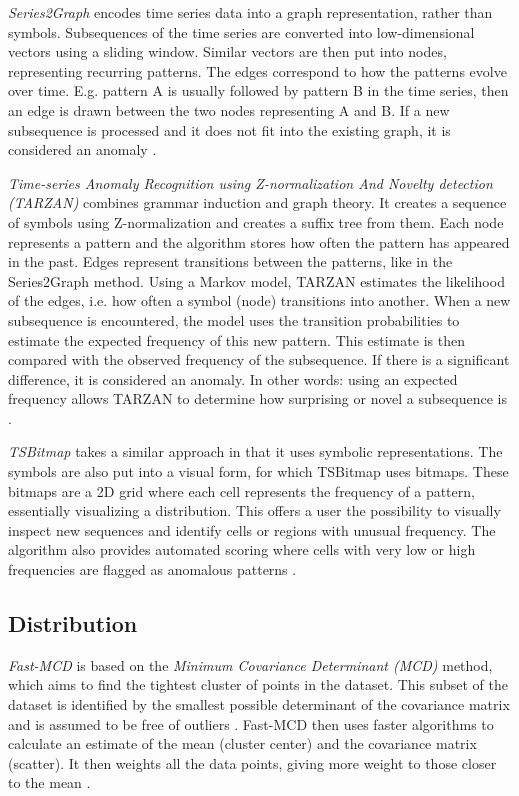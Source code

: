 \textit{Series2Graph} encodes time series data into a graph representation, rather than symbols. Subsequences of the time series are converted into low-dimensional vectors using a sliding window. Similar vectors are then put into nodes, representing recurring patterns. The edges correspond to how the patterns evolve over time. E.g. pattern A is usually followed by pattern B in the time series, then an edge is drawn between the two nodes representing A and B. If a new subsequence is processed and it does not fit into the existing graph, it is considered an anomaly \cite{Series2Graph}.

\textit{Time-series Anomaly Recognition using Z-normalization And Novelty detection (TARZAN)} combines grammar induction and graph theory. It creates a sequence of symbols using Z-normalization and creates a suffix tree from them. Each node represents a pattern and the algorithm stores how often the pattern has appeared in the past. Edges represent transitions between the patterns, like in the Series2Graph method. Using a Markov model, TARZAN estimates the likelihood of the edges, i.e. how often a symbol (node) transitions into another. When a new subsequence is encountered, the model uses the transition probabilities to estimate the expected frequency of this new pattern. This estimate is then compared with the observed frequency of the subsequence. If there is a significant difference, it is considered an anomaly. In other words: using an expected frequency allows TARZAN to determine how surprising or novel a subsequence is \cite{Tarzan}.

\textit{TSBitmap} takes a similar approach in that it uses symbolic representations. The symbols are also put into a visual form, for which TSBitmap uses bitmaps. These bitmaps are a 2D grid where each cell represents the frequency of a pattern, essentially visualizing a distribution. This offers a user the possibility to visually inspect new sequences and identify cells or regions with unusual frequency. The algorithm also provides automated scoring where cells with very low or high frequencies are flagged as anomalous patterns \cite{TSBitmap}.

\subsection{Distribution}
\textit{Fast-MCD} is based on the \textit{Minimum Covariance Determinant (MCD)} method, which aims to find the tightest cluster of points in the dataset. This subset of the dataset is identified by the smallest possible determinant of the covariance matrix and is assumed to be free of outliers \cite{Hubert2017}. Fast-MCD then uses faster algorithms to calculate an estimate of the mean (cluster center) and the covariance matrix (scatter). It then weights all the data points, giving more weight to those closer to the mean \cite{Sub-Fast-MCD}.


